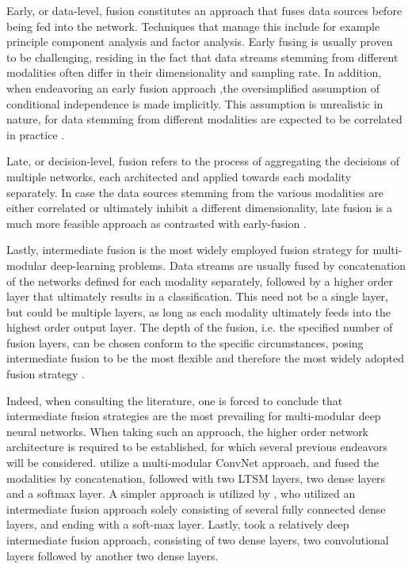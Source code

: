 \documentclass[12pt]{article}
\begin{document}
Early, or data-level, fusion constitutes an approach that fuses data sources before being fed into the network. Techniques that manage this include for example principle component analysis and factor analysis. Early fusing is usually proven to be challenging, residing in the fact that data streams stemming from different modalities often differ in their dimensionality and sampling rate. In addition, when endeavoring an early fusion approach ,the oversimplified assumption of conditional independence is made implicitly. This assumption is unrealistic in nature, for data stemming from different modalities are expected to be correlated in practice \cite{ramachandram2017deep}. 

Late, or decision-level, fusion refers to the process of aggregating the decisions of multiple networks, each architected and applied towards each modality separately. In case the data sources stemming from the various modalities are either correlated or ultimately inhibit a different dimensionality, late fusion is a much more feasible approach as contrasted with early-fusion \cite{ramachandram2017deep}.

Lastly, intermediate fusion is the most widely employed fusion strategy for multi-modular deep-learning problems. Data streams are usually fused by concatenation of the networks defined for each modality separately, followed by a higher order layer that ultimately results in a classification. This need not be a single layer, but could be multiple layers, as long as each modality ultimately feeds into the highest order output layer. The depth of the fusion, i.e. the specified number of fusion layers, can be chosen conform to the specific circumstances, posing intermediate fusion to be the most flexible and therefore the most widely adopted fusion strategy \cite{ramachandram2017deep}.

Indeed, when consulting the literature, one is forced to conclude that intermediate fusion strategies are the most prevailing for multi-modular deep neural networks. When taking such an approach, the higher order network architecture is required to be established, for which several previous endeavors will be considered.   utilize a multi-modular ConvNet approach, and fused the modalities by concatenation, followed with two LTSM layers, two dense layers and a softmax layer. A simpler approach is utilized by , who utilized an intermediate fusion approach solely consisting of several fully connected dense layers, and ending with a soft-max layer. Lastly,  took a relatively deep intermediate fusion approach, consisting of two dense layers, two convolutional layers followed by another two dense layers.  
\end{document}
